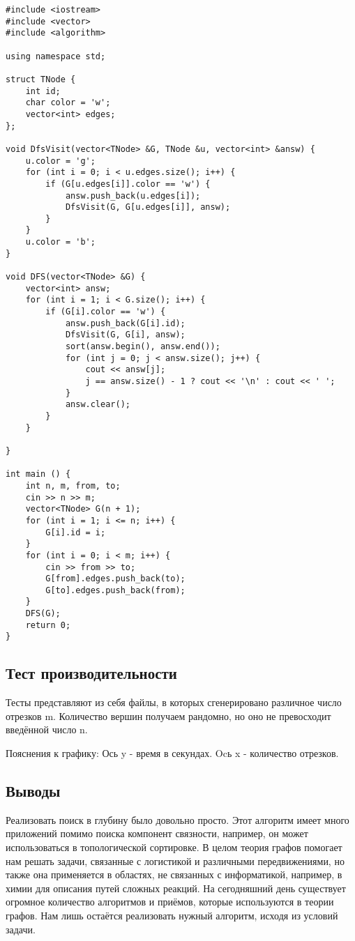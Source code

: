 \documentclass[12pt]{article}
\begin{document}
\begin{verbatim}
#include <iostream>
#include <vector>
#include <algorithm>

using namespace std;

struct TNode {
	int id;
	char color = 'w';
	vector<int> edges;
};

void DfsVisit(vector<TNode> &G, TNode &u, vector<int> &answ) {
	u.color = 'g';
	for (int i = 0; i < u.edges.size(); i++) {
		if (G[u.edges[i]].color == 'w') {
			answ.push_back(u.edges[i]);
			DfsVisit(G, G[u.edges[i]], answ);
		}
	}
	u.color = 'b';
}

void DFS(vector<TNode> &G) {
	vector<int> answ;
	for (int i = 1; i < G.size(); i++) {
		if (G[i].color == 'w') {
			answ.push_back(G[i].id);
			DfsVisit(G, G[i], answ);
			sort(answ.begin(), answ.end());
			for (int j = 0; j < answ.size(); j++) {
				cout << answ[j];
				j == answ.size() - 1 ? cout << '\n' : cout << ' ';
			}
			answ.clear();
		}
	}
	
}

int main () {
	int n, m, from, to;
	cin >> n >> m;
	vector<TNode> G(n + 1);
	for (int i = 1; i <= n; i++) {
		G[i].id = i;
	}
	for (int i = 0; i < m; i++) {
		cin >> from >> to;	
		G[from].edges.push_back(to);
		G[to].edges.push_back(from);
	}
	DFS(G);
	return 0;
}
\end{verbatim}

\subsection*{Тест производительности}

Тесты представляют из себя файлы, в которых сгенерировано различное число отрезков m. Количество вершин получаем рандомно, но оно не превосходит введённой число n.

\newline
Пояснения к графику:
Ось y - время в секундах. Ocь x - количество отрезков.

\subsection*{Выводы}

Реализовать поиск в глубину было довольно просто. Этот алгоритм имеет много приложений помимо поиска компонент связности, например, он может использоваться в топологической сортировке. В целом теория графов помогает нам решать задачи, связанные с логистикой и различными передвижениями, но также она применяется в областях, не связанных с информатикой, например, в химии для описания путей сложных реакций. На сегодняшний день существует огромное количество алгоритмов и приёмов, которые используются в теории графов. Нам лишь остаётся реализовать нужный алгоритм, исходя из условий задачи.
\end{document}
